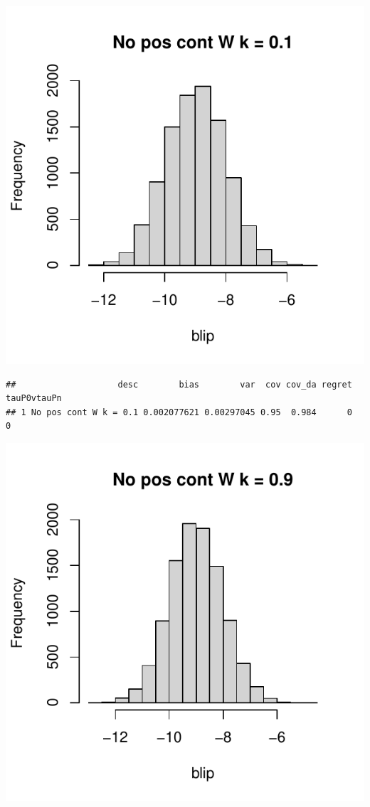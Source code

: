 \documentclass[11pt]{article}\usepackage[]{graphicx}\usepackage[table]{xcolor}
\makeatletter
\def\maxwidth{ %
  \ifdim\Gin@nat@width>\linewidth
    \linewidth
  \else
    \Gin@nat@width
  \fi
}
\newenvironment{kframe}{%
 \def\at@end@of@kframe{}%
 \ifinner\ifhmode%
  \def\at@end@of@kframe{\end{minipage}}%
  \begin{minipage}{\columnwidth}%
 \fi\fi%
 \def\FrameCommand##1{\hskip\@totalleftmargin \hskip-\fboxsep
 \colorbox{shadecolor}{##1}\hskip-\fboxsep
     \hskip-\linewidth \hskip-\@totalleftmargin \hskip\columnwidth}%
 \MakeFramed {\advance\hsize-\width
   \@totalleftmargin\z@ \linewidth\hsize
   \@setminipage}}%
 {\par\unskip\endMakeFramed%
 \at@end@of@kframe}
\newenvironment{knitrout}{}{} %
\makeatother
\begin{document}
\begin{knitrout}
\includegraphics[width=\maxwidth]{figure/unnamed-chunk-4-11} 
\begin{kframe}\begin{verbatim}
##                    desc        bias        var  cov cov_da regret tauP0vtauPn
## 1 No pos cont W k = 0.1 0.002077621 0.00297045 0.95  0.984      0           0
\end{verbatim}
\end{kframe}
\includegraphics[width=\maxwidth]{figure/unnamed-chunk-4-12} 

\end{knitrout}
\end{document}
